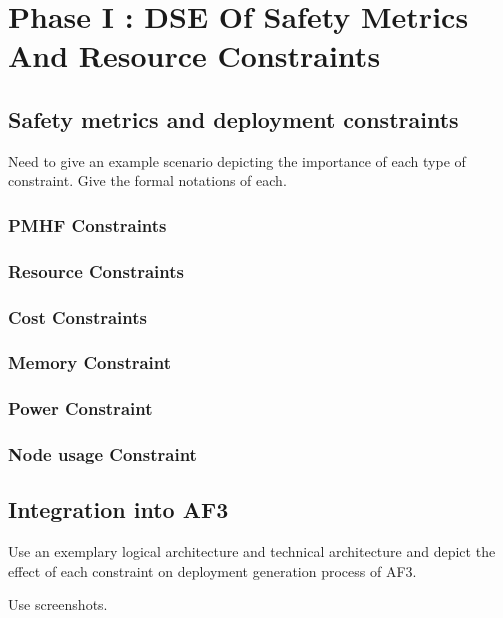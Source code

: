\chapter{Phase I : DSE Of Safety Metrics And Resource Constraints}\label{chapter:constraints}

\section{Safety metrics and deployment constraints}

Need to give an example scenario depicting the importance of each type of constraint. Give the formal notations of each.

\subsection{PMHF Constraints}

\subsection{Resource Constraints}

\subsection{Cost Constraints}

\subsection{Memory Constraint}

\subsection{Power Constraint}

\subsection{Node usage Constraint}

\section{Integration into AF3}

Use an exemplary logical architecture and technical architecture and depict the effect of each constraint on deployment generation process of AF3.

Use screenshots. 


